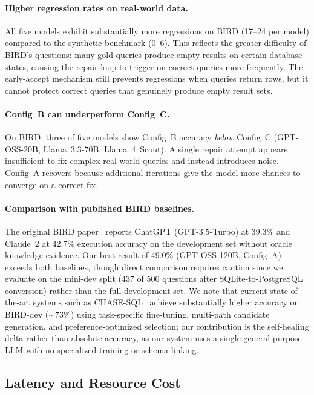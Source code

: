 \documentclass{article}
\begin{document}
\paragraph{Higher regression rates on real-world data.} All five models exhibit substantially more regressions on BIRD (17--24 per model) compared to the synthetic benchmark (0--6). This reflects the greater difficulty of BIRD's questions: many gold queries produce empty results on certain database states, causing the repair loop to trigger on correct queries more frequently. The early-accept mechanism still prevents regressions when queries return rows, but it cannot protect correct queries that genuinely produce empty result sets.

\paragraph{Config~B can underperform Config~C.} On BIRD, three of five models show Config~B accuracy \emph{below} Config~C (GPT-OSS-20B, Llama~3.3-70B, Llama~4~Scout). A single repair attempt appears insufficient to fix complex real-world queries and instead introduces noise. Config~A recovers because additional iterations give the model more chances to converge on a correct fix.

\paragraph{Comparison with published BIRD baselines.} The original BIRD paper~\citep{li2024bird} reports ChatGPT (GPT-3.5-Turbo) at 39.3\% and Claude~2 at 42.7\% execution accuracy on the development set without oracle knowledge evidence. Our best result of 49.0\% (GPT-OSS-120B, Config~A) exceeds both baselines, though direct comparison requires caution since we evaluate on the mini-dev split (437 of 500 questions after SQLite-to-PostgreSQL conversion) rather than the full development set. We note that current state-of-the-art systems such as CHASE-SQL~\citep{chasesql2024} achieve substantially higher accuracy on BIRD-dev (${\sim}$73\%) using task-specific fine-tuning, multi-path candidate generation, and preference-optimized selection; our contribution is the self-healing delta rather than absolute accuracy, as our system uses a single general-purpose LLM with no specialized training or schema linking.


\subsection{Latency and Resource Cost}
\end{document}
